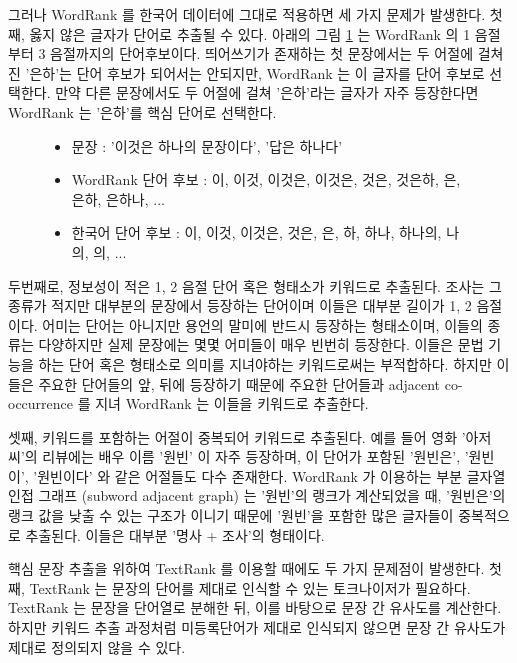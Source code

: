 \documentclass[11pt]{article}
\begin{document}
그러나 WordRank 를 한국어 데이터에 그대로 적용하면 세 가지 문제가 발생한다.
첫째, 옳지 않은 글자가 단어로 추출될 수 있다.
아래의 그림 \ref{fig:krwordrank_candidates} 는 WordRank 의 1 음절부터 3 음절까지의 단어후보이다.
띄어쓰기가 존재하는 첫 문장에서는 두 어절에 걸쳐진 '은하'는 단어 후보가 되어서는 안되지만, WordRank 는 이 글자를 단어 후보로 선택한다.
만약 다른 문장에서도 두 어절에 걸쳐 '은하'라는 글자가 자주 등장한다면 WordRank 는 '은하'를 핵심 단어로 선택한다.

\begin{figure}
\label{fig:krwordrank_candidates}
\begin{itemize}[noitemsep]
  \item 문장 : '이것은 하나의 문장이다', '답은 하나다'
  \item WordRank 단어 후보 : 이, 이것, 이것은, 이것은, 것은, 것은하, 은, 은하, 은하나, ...
  \item 한국어 단어 후보 : 이, 이것, 이것은, 것은, 은, 하, 하나, 하나의, 나의, 의, ...
\end{itemize}
\end{figure}

두번째로, 정보성이 적은 1, 2 음절 단어 혹은 형태소가 키워드로 추출된다.
조사는 그 종류가 적지만 대부분의 문장에서 등장하는 단어이며 이들은 대부분 길이가 1, 2 음절이다.
어미는 단어는 아니지만 용언의 말미에 반드시 등장하는 형태소이며, 이들의 종류는 다양하지만 실제 문장에는 몇몇 어미들이 매우 빈번히 등장한다.
이들은 문법 기능을 하는 단어 혹은 형태소로 의미를 지녀야하는 키워드로써는 부적합하다.
하지만 이들은 주요한 단어들의 앞, 뒤에 등장하기 때문에 주요한 단어들과 adjacent co-occurrence 를 지녀 WordRank 는 이들을 키워드로 추출한다.

셋째, 키워드를 포함하는 어절이 중복되어 키워드로 추출된다.
예를 들어 영화 '아저씨'의 리뷰에는 배우 이름 '원빈' 이 자주 등장하며, 이 단어가 포함된 '원빈은', '원빈이', '원빈이다' 와 같은 어절들도 다수 존재한다.
WordRank 가 이용하는 부분 글자열 인접 그래프 (subword adjacent graph) 는 '원빈'의 랭크가 계산되었을 때, '원빈은'의 랭크 값을 낮출 수 있는 구조가 이니기 때문에 '원빈'을 포함한 많은 글자들이 중복적으로 추출된다.
이들은 대부분 '명사 + 조사'의 형태이다.

핵심 문장 추출을 위하여 TextRank 를 이용할 때에도 두 가지 문제점이 발생한다.
첫째, TextRank 는 문장의 단어를 제대로 인식할 수 있는 토크나이저가 필요하다.
TextRank 는 문장을 단어열로 분해한 뒤, 이를 바탕으로 문장 간 유사도를 계산한다.
하지만 키워드 추출 과정처럼 미등록단어가 제대로 인식되지 않으면 문장 간 유사도가 제대로 정의되지 않을 수 있다.
\end{document}
